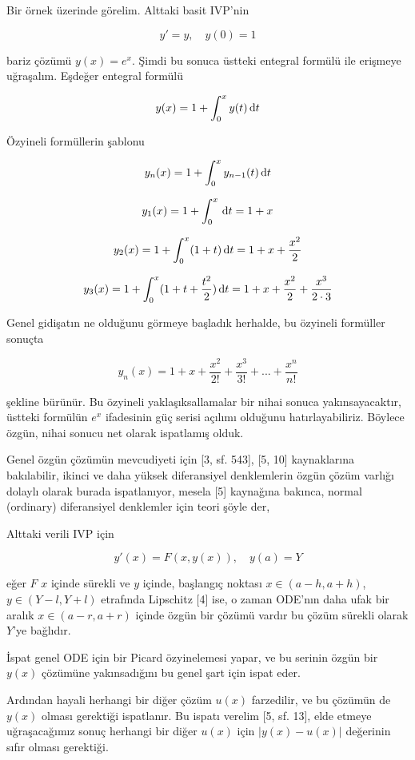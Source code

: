 \documentclass[12pt,fleqn]{article}\usepackage{../../common}
\begin{document}
Bir örnek üzerinde görelim. Alttaki basit IVP'nin

$$
y' = y, \quad y(0)=1
$$

bariz çözümü $y(x) = e^x$. Şimdi bu sonuca üstteki entegral formülü ile
erişmeye uğraşalım. Eşdeğer entegral formülü

$$
y(x) = 1 + \int _{0}^{x} y(t) \,\mathrm{d} t
$$

Özyineli formüllerin şablonu

$$
y_n(x) = 1 + \int_{0}^{x} y_{n-1}(t) \,\mathrm{d} t
$$

$$
y_1(x) = 1 + \int_{0}^{x} \,\mathrm{d} t = 1 + x
$$

$$
y_2(x) = 1 + \int_{0}^{x} (1+t) \,\mathrm{d} t = 1 + x + \frac{x^2}{2}
$$

$$
y_3(x) = 1 + \int_{0}^{x} (1 + t + \frac{t^2}{2}) \,\mathrm{d} t =
1 + x + \frac{x^2}{2} + \frac{x^3}{2 \cdot 3}
$$

Genel gidişatın ne olduğunu görmeye başladık herhalde, bu özyineli formüller
sonuçta

$$
y_n(x) = 1 + x + \frac{x^2}{2!} + \frac{x^3}{3!} + ... + \frac{x^n}{n!} 
$$

şekline bürünür. Bu özyineli yaklaşıksallamalar bir nihai sonuca
yakınsayacaktır, üstteki formülün $e^x$ ifadesinin güç serisi açılımı olduğunu
hatırlayabiliriz. Böylece özgün, nihai sonucu net olarak ispatlamış olduk.

Genel özgün çözümün mevcudiyeti için [3, sf. 543], [5, 10] kaynaklarına
bakılabilir, ikinci ve daha yüksek diferansiyel denklemlerin özgün çözüm varlığı
dolaylı olarak burada ispatlanıyor, mesela [5] kaynağına bakınca, normal
(ordinary) diferansiyel denklemler için teori şöyle der,

Alttaki verili IVP için

$$
y'(x) = F(x,y(x)), \quad y(a) = Y
$$

eğer $F$ $x$ içinde sürekli ve $y$ içinde, başlangıç noktası $x \in (a-h,a+h)$,
$y \in (Y-l,Y+l)$ etrafında Lipschitz [4] ise, o zaman ODE'nın daha ufak bir
aralık $x \in (a-r,a+r)$ içinde özgün bir çözümü vardır bu çözüm sürekli olarak
$Y$'ye bağlıdır.

İspat genel ODE için bir Picard özyinelemesi yapar, ve bu serinin özgün bir
$y(x)$ çözümüne yakınsadığını bu genel şart için ispat eder.

Ardından hayali herhangi bir diğer çözüm $u(x)$ farzedilir, ve bu çözümün de
$y(x)$ olması gerektiği ispatlanır. Bu ispatı verelim [5, sf. 13], elde etmeye
uğraşacağımız sonuç herhangi bir diğer $u(x)$ için $|y(x)-u(x)|$ değerinin sıfır
olması gerektiği.
\end{document}
